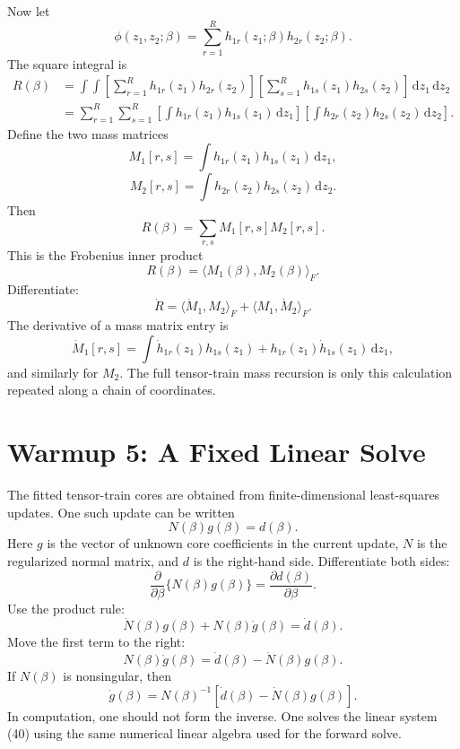 \documentclass[11pt]{article}
\newcommand{\dd}{\,\mathrm d}
\begin{document}
Now let
\[
    \phi(z_1,z_2;\beta)
    =
    \sum_{r=1}^{R}h_{1r}(z_1;\beta)h_{2r}(z_2;\beta).
    \tag{P19-29}
\]
The square integral is
\[
\begin{aligned}
    R(\beta)
    &=
    \int\!\!\int
    \left[
    \sum_{r=1}^{R}h_{1r}(z_1)h_{2r}(z_2)
    \right]
    \left[
    \sum_{s=1}^{R}h_{1s}(z_1)h_{2s}(z_2)
    \right]
    \dd z_1\dd z_2\\
    &=
    \sum_{r=1}^{R}\sum_{s=1}^{R}
    \left[\int h_{1r}(z_1)h_{1s}(z_1)\dd z_1\right]
    \left[\int h_{2r}(z_2)h_{2s}(z_2)\dd z_2\right].
\end{aligned}
\tag{P19-30}
\]
Define the two mass matrices
\[
    M_1[r,s]=\int h_{1r}(z_1)h_{1s}(z_1)\dd z_1,
    \tag{P19-31}
\]
\[
    M_2[r,s]=\int h_{2r}(z_2)h_{2s}(z_2)\dd z_2.
    \tag{P19-32}
\]
Then
\[
    R(\beta)=\sum_{r,s}M_1[r,s]M_2[r,s].
    \tag{P19-33}
\]
This is the Frobenius inner product
\[
    R(\beta)=\langle M_1(\beta),M_2(\beta)\rangle_F.
    \tag{P19-34}
\]
Differentiate:
\[
    \dot R
    =
    \langle \dot M_1,M_2\rangle_F
    +
    \langle M_1,\dot M_2\rangle_F.
    \tag{P19-35}
\]
The derivative of a mass matrix entry is
\[
    \dot M_1[r,s]
    =
    \int
    \dot h_{1r}(z_1)h_{1s}(z_1)
    +
    h_{1r}(z_1)\dot h_{1s}(z_1)
    \dd z_1,
    \tag{P19-36}
\]
and similarly for \(M_2\).  The full tensor-train mass recursion is only this
calculation repeated along a chain of coordinates.

\section{Warmup 5: A Fixed Linear Solve}

The fitted tensor-train cores are obtained from finite-dimensional least-squares
updates.  One such update can be written
\[
    N(\beta)g(\beta)=d(\beta).
    \tag{P19-37}
\]
Here \(g\) is the vector of unknown core coefficients in the current update,
\(N\) is the regularized normal matrix, and \(d\) is the right-hand side.
Differentiate both sides:
\[
    \frac{\partial}{\partial\beta}\{N(\beta)g(\beta)\}
    =
    \frac{\partial d(\beta)}{\partial\beta}.
    \tag{P19-38}
\]
Use the product rule:
\[
    \dot N(\beta)g(\beta)+N(\beta)\dot g(\beta)=\dot d(\beta).
    \tag{P19-39}
\]
Move the first term to the right:
\[
    N(\beta)\dot g(\beta)=\dot d(\beta)-\dot N(\beta)g(\beta).
    \tag{P19-40}
\]
If \(N(\beta)\) is nonsingular, then
\[
    \dot g(\beta)=
    N(\beta)^{-1}\left[\dot d(\beta)-\dot N(\beta)g(\beta)\right].
    \tag{P19-41}
\]
In computation, one should not form the inverse.  One solves the linear system
(40) using the same numerical linear algebra used for the forward solve.
\end{document}
